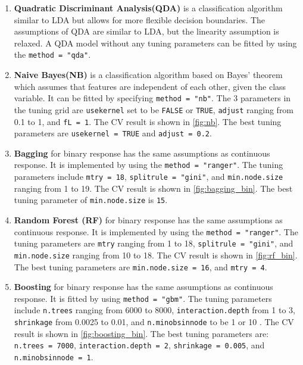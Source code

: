\documentclass[11pt]{article}
\begin{document}
\begin{enumerate}
\item \textbf{Quadratic Discriminant Analysis(QDA)} is a classification algorithm similar to LDA but allows for more flexible decision boundaries. The assumptions of QDA are similar to LDA, but the linearity assumption is relaxed. A QDA model without any tuning parameters can be fitted by using the \texttt{method = "qda"}. 

\item \textbf{Naive Bayes(NB)} is a classification algorithm based on Bayes' theorem which assumes that features are independent of each other, given the class variable. It can be fitted by specifying \texttt{method = "nb"}. The 3 parameters in the tuning grid are \texttt{usekernel} set to be \texttt{FALSE} or \texttt{TRUE}, \texttt{adjust} ranging from 0.1 to 1, and \texttt{fL = 1}. The CV result is shown in \ref{fig:nb}. The best tuning parameters are \texttt{usekernel = TRUE} and \texttt{adjust = 0.2}. 

\item \textbf{Bagging} for binary response has the same assumptions as continuous response. It is implemented by using the \texttt{method = "ranger"}. The tuning parameters include \texttt{mtry = 18}, \texttt{splitrule = "gini"}, and \texttt{min.node.size} ranging from 1 to 19. The CV result is shown in \ref{fig:bagging_bin}. The best tuning parameter of  \texttt{min.node.size} is \texttt{15}. 

\item \textbf{Random Forest (RF)} for binary response has the same assumptions as continuous response. It is implemented by using the \texttt{method = "ranger"}. The tuning parameters are \texttt{mtry} ranging from 1 to 18, \texttt{splitrule = "gini"}, and \texttt{min.node.size} ranging from 10 to 18. The CV result is shown in \ref{fig:rf_bin}. The best tuning parameters are  \texttt{min.node.size = 16}, and \texttt{mtry = 4}.

\item \textbf{Boosting} for binary response has the same assumptions as continuous response. It is fitted by using \texttt{method = "gbm"}. The tuning parameters include \texttt{n.trees} ranging from 6000 to 8000, \texttt{interaction.depth} from 1 to 3, \texttt{shrinkage} from 0.0025 to 0.01, and \texttt{n.minobsinnode} to be 1 or 10 . The CV result is shown in \ref{fig:boosting_bin}. The best tuning parameters are: 
\texttt{n.trees = 7000}, \texttt{interaction.depth = 2}, \texttt{shrinkage = 0.005}, and \texttt{n.minobsinnode = 1}. 


\end{enumerate}
\end{document}
